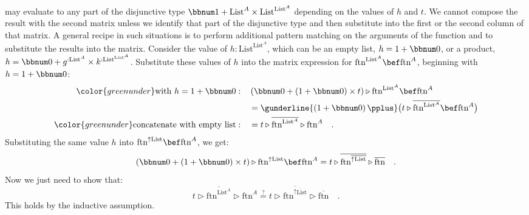 may evaluate to any part of the disjunctive type $\bbnum 1+\text{List}^{A}\times\text{List}^{\text{List}^{A}}$
depending on the values of $h$ and $t$. We cannot compose the result
with the second matrix unless we identify that part of the disjunctive
type and then substitute into the first or the second column of that
matrix. A general recipe in such situations is to perform additional
pattern matching on the arguments of the function and to substitute
the results into the matrix. Consider the value of $h:\text{List}^{\text{List}^{A}}$,
which can be an empty list, $h=1+\bbnum 0$, or a product, $h=\bbnum 0+g^{:\text{List}^{A}}\times k^{:\text{List}^{\text{List}^{A}}}$.
Substitute these values of $h$ into the matrix expression for $\text{ftn}^{\text{List}^{A}}\bef\text{ftn}^{A}$,
beginning with $h=1+\bbnum 0$:
\begin{align*}
{\color{greenunder}\text{with }h=1+\bbnum 0:}\quad & \left(\bbnum 0+\left(1+\bbnum 0\right)\times t\right)\triangleright\text{ftn}^{\text{List}^{A}}\bef\text{ftn}^{A}\\
 & =\gunderline{\left(1+\bbnum 0\right)\pplus}\big(t\triangleright\overline{\text{ftn}^{\text{List}^{A}}}\bef\text{ftn}^{A}\big)\\
{\color{greenunder}\text{concatenate with empty list}:}\quad & =t\triangleright\overline{\text{ftn}^{\text{List}^{A}}}\triangleright\text{ftn}^{A}\quad.
\end{align*}
Substituting the same value $h$ into $\text{ftn}^{\uparrow\text{List}}\bef\text{ftn}^{A}$,
we get:
\[
\left(\bbnum 0+\left(1+\bbnum 0\right)\times t\right)\triangleright\text{ftn}^{\uparrow\text{List}}\bef\text{ftn}^{A}=t\triangleright\overline{\text{ftn}^{\overline{\uparrow\text{List}}}}\triangleright\overline{\text{ftn}}\quad.
\]
Now we just need to show that:
\[
t\triangleright\overline{\text{ftn}^{\text{List}^{A}}}\triangleright\text{ftn}^{A}\overset{?}{=}t\triangleright\overline{\text{ftn}^{\overline{\uparrow\text{List}}}}\triangleright\overline{\text{ftn}}\quad.
\]
This holds by the inductive assumption.

